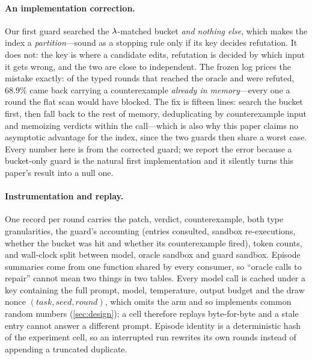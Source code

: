\paragraph{An implementation correction.}
Our first guard searched the $\lambda$-matched bucket \emph{and nothing else},
which makes the index a \emph{partition}---sound as a stopping rule only if its
key decides refutation. It does not: the key is where a candidate edits,
refutation is decided by which input it gets wrong, and the two are close to
independent. The frozen log prices the mistake exactly: of the typed rounds
that reached the oracle and were refuted, $68.9\%$ came back carrying a
counterexample \emph{already in memory}---every one a round the flat scan would
have blocked. The fix is fifteen lines: search the bucket first, then fall back
to the rest of memory, deduplicating by counterexample input and memoizing
verdicts within the call---which is also why this paper claims no asymptotic
advantage for the index, since the two guards then share a worst case. Every
number here is from the corrected guard; we report the error because a
bucket-only guard is the natural first implementation and it silently turns
this paper's result into a null one.

\paragraph{Instrumentation and replay.}
One record per round carries the patch, verdict, counterexample, both type
granularities, the guard's accounting (entries consulted, sandbox
re-executions, whether the bucket was hit and whether its counterexample
fired), token counts, and wall-clock split between model, oracle sandbox and
guard sandbox. Episode summaries come from one function shared by every
consumer, so ``oracle calls to repair'' cannot mean two things in two tables.
Every model call is cached under a key containing the full prompt, model,
temperature, output budget and the draw nonce $(\textit{task}, \textit{seed},
\textit{round})$, which omits the arm and so implements common random numbers
(\cref{sec:design}); a cell therefore replays byte-for-byte and a stale entry
cannot answer a different prompt.
Episode identity is a deterministic hash of the experiment cell, so an
interrupted run rewrites its own rounds instead of appending a truncated
duplicate.
